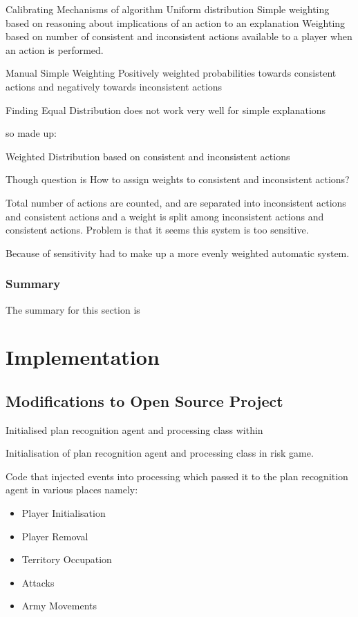 \documentclass[parskip]{cs4rep}
\begin{document}
Calibrating Mechanisms of algorithm
Uniform distribution
Simple weighting based on reasoning about implications of an action to an explanation
Weighting based on number of consistent and inconsistent actions available to a player when an action is performed.

Manual Simple Weighting
Positively weighted probabilities towards consistent actions and negatively towards inconsistent actions

Finding
Equal Distribution does not work very well for simple explanations

so made up:

Weighted Distribution based on consistent and inconsistent actions

Though question is How to assign weights to consistent and inconsistent actions?

Total number of actions are counted, and are separated into inconsistent actions and consistent actions and a weight is split among inconsistent actions and consistent actions. Problem is that it seems this system is too sensitive.

Because of sensitivity had to make up a more evenly weighted automatic system.

\subsection{Summary}

The summary for this section is

\chapter{Implementation}

\section{Modifications to Open Source Project}

Initialised plan recognition agent and processing class within 

Initialisation of plan recognition agent and processing class in risk game.

Code that injected events into processing which passed it to the plan recognition agent in various places namely:

\begin{itemize}
\item
Player Initialisation
\item
Player Removal
\item
Territory Occupation
\item
Attacks
\item
Army Movements
\end{itemize}
\end{document}
